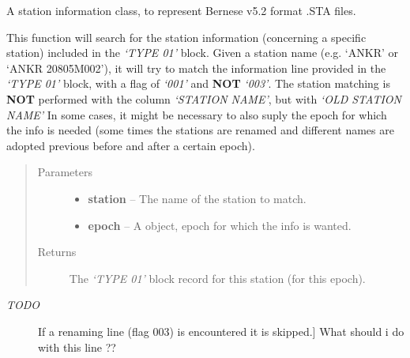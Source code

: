 \documentclass[letterpaper,10pt,english]{sphinxmanual}
\begin{document}
\begin{fulllineitems}
\label{bsta:bsta.stafile}
A station information class, to represent Bernese v5.2 format .STA 
files.

\begin{fulllineitems}
\label{bsta:bsta.stafile.findStationType01}
This function will search for the station information (concerning
a specific station) included in the \emph{`TYPE 01'} block.
Given a station name (e.g. `ANKR' or `ANKR 20805M002'), it will
try to match the information line provided in the \emph{`TYPE 01'} block,
with a flag of \emph{`001'} and \textbf{NOT} \emph{`003'}. The station matching is \textbf{NOT}
performed with the column \emph{`STATION NAME'}, but with \emph{`OLD STATION NAME'}
In some cases, it might be necessary to also suply the epoch for
which the info is needed (some times the stations are renamed and
different names are adopted previous before and after a certain
epoch).
\begin{quote}\begin{description}
\item[{Parameters}] \leavevmode\begin{itemize}
\item {} 
\textbf{station} -- The name of the station to match.

\item {} 
\textbf{epoch} -- A  object, epoch for which the info is
wanted.

\end{itemize}

\item[{Returns}] \leavevmode
The \emph{`TYPE 01'} block record for this station (for
this epoch).

\end{description}\end{quote}
\begin{description}
\item[{\emph{TODO}}] \leavevmode{[}If a renaming line (flag 003) is encountered it is skipped.{]}
What should i do with this line ??

\end{description}

\end{fulllineitems}


\end{fulllineitems}
\end{document}
